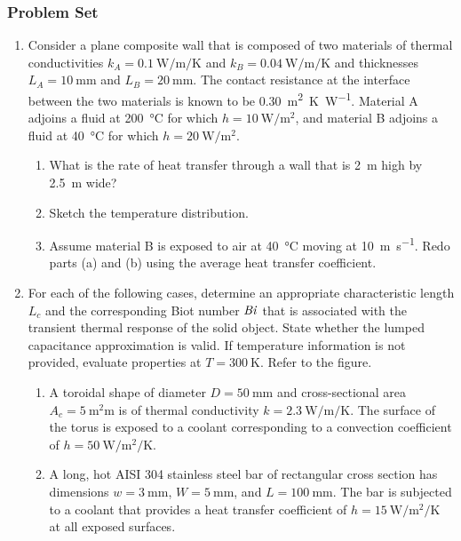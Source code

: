 \documentclass[12pt,letterpaper]{article}
\begin{document}
\subsubsection*{Problem Set}
\begin{enumerate}

    \item Consider a plane composite wall that is composed of two materials of thermal conductivities $k_A = \SI{0.1}{\watt\per\meter\per\kelvin}$ and $k_B = \SI{0.04}{\watt\per\meter\per\kelvin}$ and thicknesses $L_A = \SI{10}{\milli\meter}$ and $L_B = \SI{20}{\milli\meter}$.
    The contact resistance at the interface between the two materials is known to be \SI{0.30}{\square\meter\kelvin\per\watt}.
    Material A adjoins a fluid at \SI{200}{\celsius} for which $h = \SI{10}{\watt\per\square\meter}$, and material B adjoins a fluid at \SI{40}{\celsius} for which $h = \SI{20}{\watt\per\square\meter}$.
    
    \begin{enumerate}
        \item What is the rate of heat transfer through a wall that is \SI{2}{\meter} high by \SI{2.5}{\meter} wide?
        \item Sketch the temperature distribution.
        \item Assume material B is exposed to air at \SI{40}{\celsius} moving at \SI{10}{\meter\per\second}.
        Redo parts (a) and (b) using the average heat transfer coefficient.
    \end{enumerate}

    \item For each of the following cases, determine an appropriate characteristic length $L_c$ and the corresponding Biot number $\mathit{Bi}$ that is associated with the transient thermal response of the solid object.
    State whether the lumped capacitance approximation is valid.
    If temperature information is not provided, evaluate properties at $T = \SI{300}{\kelvin}$.
    Refer to the figure.
    \begin{enumerate}
        \item A toroidal shape of diameter $D = \SI{50}{\milli\meter}$ and cross-sectional area $A_c = \SI{5}{\square\milli\meter}$ is of thermal conductivity $k = \SI{2.3}{\watt\per\meter\per\kelvin}$.
        The surface of the torus is exposed to a coolant corresponding to a convection coefficient of $h = \SI{50}{\watt\per\square\meter\per\kelvin}$.
        
        \item A long, hot AISI 304 stainless steel bar of rectangular cross section has dimensions $w = \SI{3}{\milli\meter}$, $W = \SI{5}{\milli\meter}$, and $L = \SI{100}{\milli\meter}$.
        The bar is subjected to a coolant that provides a heat transfer coefficient of $h = \SI{15}{\watt\per\square\meter\per\kelvin}$ at all exposed surfaces.
        

\end{enumerate}
\end{enumerate}
\end{document}
